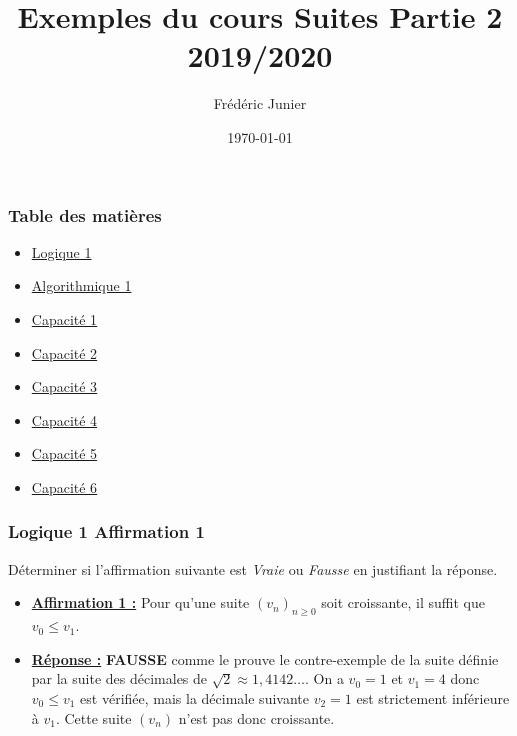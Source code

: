 \documentclass[11pt, hyperref={urlcolor=red,%
            linkcolor=blue, %
            colorlinks=true}]{beamer}
\title[suites]{Exemples du cours Suites Partie 2 2019/2020}
\author[F.Junier]{Fr\'ed\'eric Junier}
\institute[Le Parc]{{\centering Lyc\'ee du Parc \\
1 Boulevard Anatole France \\ 69006 Lyon }}
\date[\today]{\today}
\newcommand{\suite}[1]{\ensuremath{\left(#1_{n}\right)}}
\newcommand{\Suite}[2]{\ensuremath{\left(#1\right)_{#2}}}
\begin{document}
\frame{\titlepage}

 


\begin{frame}
\frametitle{Table des matières}
\begin{itemize}
	\item \hyperlink{logique1}{Logique 1}
    \item \hyperlink{algo1}{Algorithmique 1}
    \item \hyperlink{capacite1}{Capacité 1}
    \item \hyperlink{capacite2}{Capacité 2}
        \item \hyperlink{capacite3}{Capacité 3}
            \item \hyperlink{capacite4}{Capacité 4}
                \item \hyperlink{capacite5}{Capacité 5}
                    \item \hyperlink{capacite6}{Capacité 6}
\end{itemize}

\end{frame}

\begin{frame}
\frametitle{Logique 1 Affirmation 1}
\label{logique1}
Déterminer si l'affirmation suivante est  \textit{Vraie} ou \textit{Fausse} en justifiant la réponse. 



\begin{itemize}
    \item \underline{\textbf{Affirmation 1 :}}
Pour qu'une suite $\Suite{v_{n}}{n \geqslant 0}$  soit croissante, il suffit que   $v_{0} \leqslant v_{1}$. 

\pause \item  \underline{\textbf{Réponse :}} \textbf{ FAUSSE} comme le prouve le contre-exemple de la suite définie par la suite des décimales de $\sqrt{2}\approx 1,4142 \ldots$. On a $v_{0}=1$ et $v_{1}=4$ donc $v_{0}\leqslant v_{1}$ est vérifiée, mais la décimale suivante $v_{2}=1$ est strictement inférieure à $v_{1}$. Cette suite $\suite{v}$ n'est pas donc croissante.
\end{itemize}
	
	

\end{frame}

		
	
\end{document}
